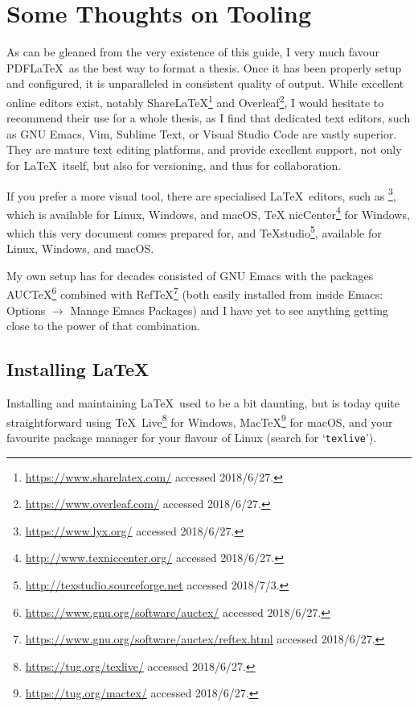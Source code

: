 
\chapter*{Some Thoughts on Tooling}
\label{cha:some-thoughts-tool}


As can be gleaned from the very existence of this guide, I very much
favour PDF\LaTeX\ as the best way to format a thesis. Once it has been
properly setup and configured, it is unparalleled in consistent
quality of output.  While excellent online editors exist, notably
Share\LaTeX\footnote{\url{https://www.sharelatex.com/} accessed 2018/6/27.} and
Overleaf\footnote{\url{https://www.overleaf.com/} accessed 2018/6/27.}, I would hesitate
to recommend their use for a whole thesis, as I find that dedicated
text editors, such as GNU Emacs, Vim, Sublime Text, or Visual Studio
Code are vastly superior.  They are mature text editing platforms, and
provide excellent support, not only for \LaTeX\ itself, but also for
versioning, and thus for collaboration.

If you prefer a more visual tool, there are specialised \LaTeX\
editors, such as \mLyX\footnote{\url{https://www.lyx.org/} accessed
  2018/6/27.}, which is available for Linux, Windows, and macOS, \TeX
nicCenter\footnote{\url{http://www.texniccenter.org/} accessed
  2018/6/27.} for Windows, which this very document comes prepared
for, and \TeX studio\footnote{\url{http://texstudio.sourceforge.net}
  accessed 2018/7/3.}, available for Linux, Windows, and macOS.

My own setup has for decades consisted of GNU Emacs with the packages
AUC\TeX\footnote{\url{https://www.gnu.org/software/auctex/} accessed 2018/6/27.} combined
with
Ref\TeX\footnote{\url{https://www.gnu.org/software/auctex/reftex.html} accessed 2018/6/27.}
(both easily installed from inside Emacs: Options $\rightarrow$ Manage
Emacs Packages) and I have yet to see anything getting close to the
power of that combination.

\section*{Installing \LaTeX}
\label{sec:installing-latex}

Installing and maintaining \LaTeX\ used to be a bit daunting, but is today
quite straightforward using \TeX\
Live\footnote{\url{https://tug.org/texlive/} accessed 2018/6/27.} for Windows,
Mac\TeX\footnote{\url{https://tug.org/mactex/} accessed 2018/6/27.} for mac\-OS, and your
favourite package manager for your flavour of Linux (search for `\texttt{texlive}').


